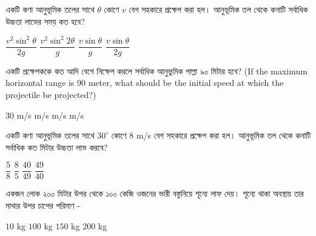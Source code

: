 \documentclass[addpoints]{exam}
\begin{document}
\begin{questions}
\question একটি কণা আনুভূমিক তলের সাথে $ \theta $ কোণে $ v $ বেগ সহকারে প্রক্ষেপ করা হল। আনুভূমিক তল থেকে কনাটি সর্বাধিক উচ্চতা লাভের সময় কত হবে? 

\begin{oneparchoices}
\choice $\dfrac{v^{2}\sin^{2}\theta}{2g} $
\choice $\dfrac{v^{2}\sin^{2}2\theta}{g} $
\choice $\dfrac{v\sin\theta}{g} $
\choice $\dfrac{v\sin \theta}{2g} $
\end{oneparchoices}


 \question একটি প্রক্ষেপককে কত আদি বেগে নিক্ষেপ করলে সর্বাধিক আনুভুমিক পাল্লা ৯০ মিটার হবে? (If the maximum horizontal range is 90 meter, what should be the initial speed at which the projectile be projected?)

\begin{oneparchoices}
\choice $ 30 $ m/s
 m/s
 m/s
 m/s
\end{oneparchoices}



\question একটি কণা আনুভূমিক তলের সাথে $ 30^{\circ} $ কোণে $ 8 $ m/s বেগ সহকারে প্রক্ষেপ করা হল। আনুভূমিক তল থেকে কনাটি সর্বাধিক কত মিটার উচ্চতা লাভ করবে? 

\begin{oneparchoices}
\choice $\dfrac{5}{8} $
\choice $\dfrac{8}{5} $
\choice $\dfrac{40}{49} $
\choice $\dfrac{49}{40} $
\end{oneparchoices}

\question  একজন লোক ২০০ মিটার উপর থেকে ১০০ কেজি ওজনের ভারী বস্তুনিয়ে শূন্যে লাফ দেয়।  শূন্যে থাকা অবস্থায় তার মাথার উপর চাপের পরিমাণ -  

\begin{oneparchoices}
\choice $ 10 $ kg
\choice $ 100 $ kg
\choice $ 150 $ kg
\choice $ 200 $ kg
\end{oneparchoices}

\end{questions}
\end{document}
